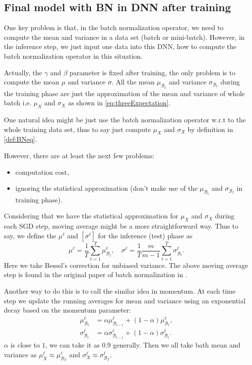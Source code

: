 \subsection{Final model  with BN in DNN after training}
One key problem is that, in the batch normalization operator, we need to compute the mean and variance 
in a data set (batch or mini-batch). However, in the inference step, we just input one data 
into this DNN, how to compute the batch normalization operator in this situation. 

Actually,  the $\gamma$ and $\beta$ parameter is fixed after training, the only problem is
to compute the mean $\mu$ and variance $\sigma$. 
All the mean $ \mu_{\mathcal B_t}  $ and variance $\sigma_{\mathcal B_t} $ during the training phase 
are just the approximation of the mean and variance of whole batch i.e.  $ \mu_{X}  $ and $\sigma_{X}$ 
as shown in \eqref{eq:threeExpectation}. 

One natural idea might be just use the batch normalization operator w.r.t to the whole training data set, thus to say
just compute $\mu_X$ and $\sigma_X$ by definition in \eqref{def:BNeq}.


However, there are at least the next few problems:
\begin{itemize}
\item computation cost,
\item ignoring the statistical approximation (don't make use of the $ \mu_{\mathcal B_t}  $ and  $\sigma_{\mathcal B_t} $ in training phase).
\end{itemize}

Considering that we have the statistical approximation for $ \mu_{X}  $ and $\sigma_{X}$
during each SGD step, moving average might be a more straightforward way.
Thus to say, we define the $\mu^\ell$ and $[\sigma^\ell]$ for the inference (test) phase
as
\begin{equation}
\mu^\ell = \frac{1}{T}\sum_{t=1}^T \mu^\ell_{\mathcal B_t}, 
\quad \sigma^\ell =\frac{1}{T} \frac{m}{m-1}\sum_{t=1}^T\sigma^\ell_{\mathcal B_t}.
\end{equation}
Here we take Bessel's correction for unbiased variance.
The above moving average step is found in the original paper of batch normalization in \cite{ioffe2015batch}. 

Another way to do this is to call the similar idea in momentum. 
At each time step we update the running averages for mean and variance using an exponential decay based on the momentum parameter:    
\begin{equation}
\begin{aligned}
\mu^\ell_{\mathcal B_t} &=\alpha \mu^\ell_{\mathcal B_{t-1}} + (1-\alpha)\mu^\ell_{\mathcal B_t} , \\
\sigma^\ell_{\mathcal B_t} &=\alpha \sigma^\ell_{\mathcal B_{t-1}} + (1-\alpha)\sigma^\ell_{\mathcal B_t} .
\end{aligned}
\end{equation}
$\alpha$ is close to $1$, we can take it as $0.9$ generally. Then we all take bath mean and variance as
$\mu^\ell_X  \approx \mu^\ell_{\mathcal B_T}$  and $\sigma^\ell_X  \approx \sigma^\ell_{\mathcal B_T}$.

